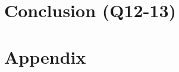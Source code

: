 \documentclass[10pt,twocolumn]{article}
\begin{document}


\section{Conclusion (Q12-13)}

\clearpage
\printbibliography

\clearpage
\appendix
\section{Appendix}
\label{Code}
% 
\end{document}
